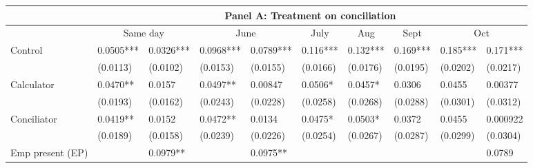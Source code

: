 \begin{tabular}{rrrrrrrrrr}
\toprule
      & \multicolumn{9}{c}{Panel A: Treatment on conciliation} \\
\midrule
      & \multicolumn{2}{c}{Same day} & \multicolumn{2}{c}{June} & \multicolumn{1}{c}{July } & \multicolumn{1}{c}{Aug} & \multicolumn{1}{c}{Sept} & \multicolumn{2}{c}{Oct} \\
      \midrule
\multicolumn{1}{l}{Control} & \multicolumn{1}{l}{0.0505***} & \multicolumn{1}{l}{0.0326***} & \multicolumn{1}{l}{0.0968***} & \multicolumn{1}{l}{0.0789***} & \multicolumn{1}{l}{0.116***} & \multicolumn{1}{l}{0.132***} & \multicolumn{1}{l}{0.169***} & \multicolumn{1}{l}{0.185***} & \multicolumn{1}{l}{0.171***} \\
\multicolumn{1}{l}{} & \multicolumn{1}{l}{(0.0113)} & \multicolumn{1}{l}{(0.0102)} & \multicolumn{1}{l}{(0.0153)} & \multicolumn{1}{l}{(0.0155)} & \multicolumn{1}{l}{(0.0166)} & \multicolumn{1}{l}{(0.0176)} & \multicolumn{1}{l}{(0.0195)} & \multicolumn{1}{l}{(0.0202)} & \multicolumn{1}{l}{(0.0217)} \\
\multicolumn{1}{l}{Calculator} & \multicolumn{1}{l}{0.0470**} & \multicolumn{1}{l}{0.0157} & \multicolumn{1}{l}{0.0497**} & \multicolumn{1}{l}{0.00847} & \multicolumn{1}{l}{0.0506*} & \multicolumn{1}{l}{0.0457*} & \multicolumn{1}{l}{0.0306} & \multicolumn{1}{l}{0.0455} & \multicolumn{1}{l}{0.00377} \\
\multicolumn{1}{l}{} & \multicolumn{1}{l}{(0.0193)} & \multicolumn{1}{l}{(0.0162)} & \multicolumn{1}{l}{(0.0243)} & \multicolumn{1}{l}{(0.0228)} & \multicolumn{1}{l}{(0.0258)} & \multicolumn{1}{l}{(0.0268)} & \multicolumn{1}{l}{(0.0288)} & \multicolumn{1}{l}{(0.0301)} & \multicolumn{1}{l}{(0.0312)} \\
\multicolumn{1}{l}{Conciliator} & \multicolumn{1}{l}{0.0419**} & \multicolumn{1}{l}{0.0152} & \multicolumn{1}{l}{0.0472**} & \multicolumn{1}{l}{0.0134} & \multicolumn{1}{l}{0.0475*} & \multicolumn{1}{l}{0.0503*} & \multicolumn{1}{l}{0.0372} & \multicolumn{1}{l}{0.0455} & \multicolumn{1}{l}{0.000922} \\
\multicolumn{1}{l}{} & \multicolumn{1}{l}{(0.0189)} & \multicolumn{1}{l}{(0.0158)} & \multicolumn{1}{l}{(0.0239)} & \multicolumn{1}{l}{(0.0226)} & \multicolumn{1}{l}{(0.0254)} & \multicolumn{1}{l}{(0.0267)} & \multicolumn{1}{l}{(0.0287)} & \multicolumn{1}{l}{(0.0299)} & \multicolumn{1}{l}{(0.0304)} \\
\multicolumn{1}{l}{Emp present (EP)} & \multicolumn{1}{l}{} & \multicolumn{1}{l}{0.0979**} & \multicolumn{1}{l}{} & \multicolumn{1}{l}{0.0975**} & \multicolumn{1}{l}{} & \multicolumn{1}{l}{} & \multicolumn{1}{l}{} & \multicolumn{1}{l}{} & \multicolumn{1}{l}{0.0789} \\

\end{tabular}
